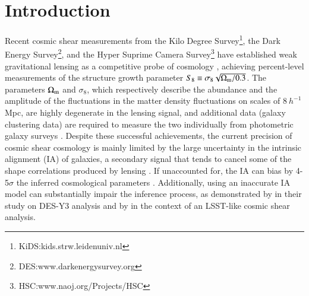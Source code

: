 \section{Introduction}
\label{sec:intro}

Recent cosmic shear measurements from the Kilo Degree Survey\footnote{KiDS:kids.strw.leidenuniv.nl}, the Dark Energy Survey\footnote{DES:www.darkenergysurvey.org}, and the Hyper Suprime Camera Survey\footnote{HSC:www.naoj.org/Projects/HSC} have established weak gravitational lensing as a competitive probe of cosmology \citep[see. \eg][]{KiDS1000_Asgari, KiDS1000_vdB, KiDS1000_Li, DESY3_Secco, DESY3_Amon, HSCY3_Cl, HSCY3_2pcf}, achieving  percent-level measurements of the structure growth parameter $S_8\equiv\sigma_8\sqrt{\Omega_{\rm m}/0.3}$.
The parameters $\Omega_{\rm m}$ and $\sigma_8$, which respectively describe the abundance and the amplitude of the fluctuations in the matter density fluctuations on scales of $8 \: h^{-1}$ Mpc, are highly degenerate in the lensing signal, and additional data (\eg galaxy clustering data) are required to measure the two individually from photometric galaxy surveys \citep{KiDS1000_Heymans, DESY3_3x2, HSCY3_3x2}.
Despite these successful achievements, the current precision of cosmic shear cosmology is mainly limited by the large uncertainty in the intrinsic alignment (IA) of galaxies, a secondary signal that tends to cancel some of the shape correlations produced by lensing \citep[see. \eg][for reviews on IA]{Troxel_IA_review_2015, Kirk_IA_review_2015, Joachimi_IA_review_2015, Kiessling_IA_review_2015,Lamman_IA_guide}. 
If unaccounted for, the IA can bias by 4-5$\sigma$ the inferred cosmological parameters \citep{Kirk2012, Krause2016}.
Additionally, using an inaccurate IA model can substantially impair the inference process, as demonstrated by \citet{DESY3_Secco} in their study on DES-Y3 analysis and by \citet{Paopiamsap2024} in the context of an LSST-like cosmic shear analysis.

